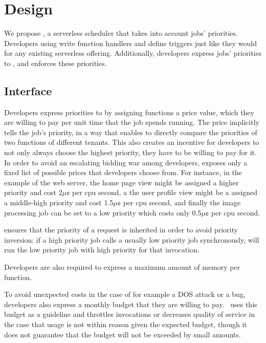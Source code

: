 \section{Design}\label{design}

We propose \sys{}, a serverless scheduler that takes into account jobs'
priorities. Developers using \sys{} write function handlers and define triggers
just like they would for any existing serverless offering. Additionally,
developers express jobs' priorities to \sys{}, and \sys{} enforces these
priorities.



\subsection{Interface}

Developers express priorities to \sys{} by assigning functions a price value,
which they are willing to pay per unit time that the job spends running. The
price implicitly tells \sys{} the job's priority, in a way that enables \sys{}
to directly compare the priorities of two functions of different tenants. This
also creates an incentive for developers to not only always choose the highest
priority, they have to be willing to pay for it. In order to avoid an escalating
bidding war among developers, \sys{} exposes only a fixed list of possible
prices that developers choose from. For instance, in the example of the web
server, the home page view might be assigned a higher priority and cost
2$\mu\cent$ per cpu second, a the user profile view might be a assigned a
middle-high priority and cost 1.5$\mu\cent$ per cpu second, and finally the
image processing job can be set to a low priority which costs only 0.5$\mu\cent$
per cpu second. 

\Sys{} ensures that the priority of a request is inherited in order to avoid
priority inversion: if a high priority job calls a usually low priority job
synchronously, \sys{} will run the low priority job with high priority for that
invocation.

Developers are also required to express a maximum amount of memory per function.
 
To avoid unexpected costs in the case of for example a DOS attack or a bug,
developers also express a monthly budget that they are willing to pay.\ \sys{}
uses this budget as a guideline and throttles invocations or decreases quality
of service in the case that usage is not within reason given the expected
budget, though it does not guarantee that the budget will not be exceeded by
small amounts.



